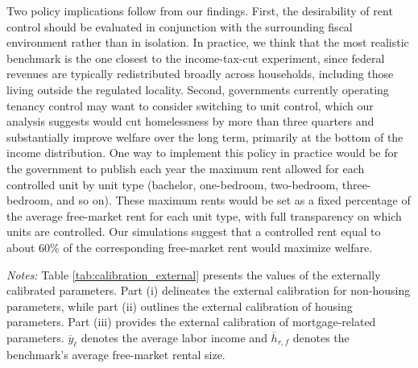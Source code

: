 \documentclass[parskip=full]{article}
\newenvironment{fignote2}[1]
{
\par
\medskip
\begin{minipage}{#1}
\footnotesize
}
{
\end{minipage}
}
\begin{document}
Two policy implications follow from our findings. First, the desirability of rent control should be evaluated in conjunction with the surrounding fiscal environment rather than in isolation. In practice, we think that the most realistic benchmark is the one closest to the income-tax-cut experiment, since federal revenues are typically redistributed broadly across households, including those living outside the regulated locality. Second, governments currently operating tenancy control may want to consider switching to unit control, which our analysis suggests would cut homelessness by more than three quarters and substantially improve welfare over the long term, primarily at the bottom of the income distribution. One way to implement this policy in practice would be for the government to publish each year the maximum rent allowed for each controlled unit by unit type (bachelor, one-bedroom, two-bedroom, three-bedroom, and so on). These maximum rents would be set as a fixed percentage of the average free-market rent for each unit type, with full transparency on which units are controlled. Our simulations suggest that a controlled rent equal to about 60\% of the corresponding free-market rent would maximize welfare.




\vspace{1cm}

\begin{table}[H]
    \centering
    \caption{Externally assigned parameter values}
    \vspace{-0.5cm}
    \label{tab:calibration_external}
    
    \vspace{-0.45cm}
    \begin{fignote2}{1.02\textwidth}
    \textit{Notes:} Table \ref{tab:calibration_external} presents the values of the externally calibrated parameters. Part (i) delineates the external calibration for non-housing parameters, while part (ii) outlines the external calibration of housing parameters. Part (iii) provides the external calibration of mortgage-related parameters. $\overline{y}_{\ell}$ denotes the average labor income and $\overline{h}_{r,f}$ denotes the benchmark's average free-market rental size.
    \end{fignote2}
\end{table}
\end{document}
